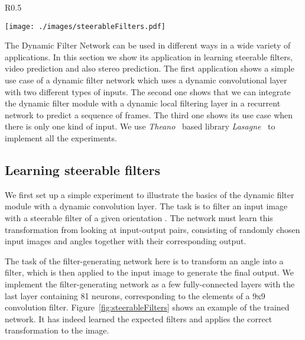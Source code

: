 \begin{wrapfigure}{R}{0.5\textwidth}
\vspace{-5pt}
  \begin{center}
    \texttt{[image: ./images/steerableFilters.pdf]}	
  \end{center}  
  \caption{\small The dynamic filter network for learning steerable filters and several examples of learned filters.}
  \label{fig:steerableFilters}
  \vspace{-5pt}
\end{wrapfigure}
The Dynamic Filter Network can be used in different ways in a wide variety of applications. 
In this section we show its application in learning steerable filters, video prediction and also stereo prediction. 
The first application shows a simple use case of a dynamic filter network which uses a dynamic convolutional layer with two different types of inputs.
The second one shows that we can integrate the dynamic filter module with a dynamic local filtering layer in a recurrent network to predict a sequence of frames.
The third one shows its use case when there is only one kind of input.
We use \textit{Theano}~\cite{Theano-2012} based library \textit{Lasagne}~\cite{lasagne} to implement all the experiments.

\subsection{Learning steerable filters}
We first set up a simple experiment to illustrate the basics of the dynamic filter module with a dynamic convolution layer. 
The task is to filter an input image with a steerable filter of a given orientation . 
The network must learn this transformation from looking at input-output pairs, consisting of randomly chosen input images and angles together with their corresponding output.

The task of the filter-generating network here is to transform an angle into a filter, which is then applied to the input image to generate the final output.
We implement the filter-generating network as a few fully-connected layers with the last layer containing 81 neurons, corresponding to the elements of a 9x9 convolution filter. 
Figure~\ref{fig:steerableFilters} shows an example of the trained network. 
It has indeed learned the expected filters and applies the correct transformation to the image.

